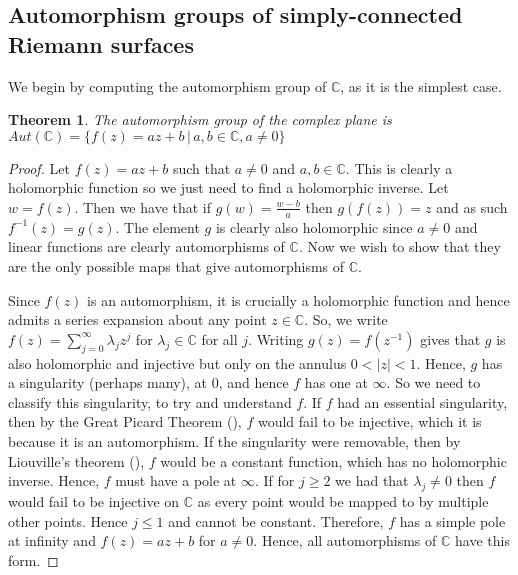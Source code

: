 \documentclass[11pt]{report}
\newtheorem{thm}{Theorem}[section]
\theoremstyle{definition}
\begin{document}
\subsection{Automorphism groups of simply-connected Riemann surfaces}
We begin by computing the automorphism group of $\mathbb{C}$, as it is the simplest case.
\begin{thm}\label{Aut(C)} 
  The automorphism group of the complex plane is ~\\$Aut(\mathbb{C})=\{f(z)=az+b \, \vert \, a, b \in  \mathbb{C}, a \neq 0\}$
\end{thm}
\begin{proof}
  Let $f(z) = az+b$ such that $a\neq 0$ and $a,b \in \mathbb{C}$. This is clearly a holomorphic function so we just need to find a holomorphic inverse. Let $w = f(z)$. Then we have that if $g(w) = \frac{w - b}{a}$ then $g(f(z))=z$ and as such $f^{-1}(z)=g(z)$. The element $g$ is clearly also holomorphic since $a \neq 0$ and linear functions are clearly automorphisms of $\mathbb{C}$. Now we wish to show that they are the only possible maps that give automorphisms of $\mathbb{C}$.

  Since $f(z)$ is an automorphism, it is crucially a holomorphic function and hence admits a series expansion about any point $z \in \mathbb{C}$. So, we write $f(z) = \sum\limits_{j=0}^{\infty}\lambda_jz^j$ for $\lambda_j \in \mathbb{C}$ for all $j$. Writing $g(z)=f(z^{-1})$ gives that $g$ is also holomorphic and injective but only on the annulus $0 < |z| < 1$. Hence, $g$ has a singularity (perhaps many), at $0$, and hence $f$ has one at $\infty$. So we need to classify this singularity, to try and understand $f$. If $f$ had an essential singularity, then by the Great Picard Theorem (\cite[p.300]{conway}), $f$ would fail to be injective, which it is because it is an automorphism. If the singularity were removable, then by Liouville's theorem (\cite[p.122]{ahlfors}), $f$ would be a constant function, which has no holomorphic inverse. Hence, $f$ must have a pole at $\infty$. If for $j\geq 2$ we had that $\lambda_j \neq 0$ then $f$ would fail to be injective on $\mathbb{C}$ as every point would be mapped to by multiple other points. Hence $j \leq 1$ and cannot be constant. Therefore, $f$ has a simple pole at infinity and $f(z) = az + b$ for $a \neq 0$. Hence, all automorphisms of $\mathbb{C}$ have this form.
\end{proof}
\end{document}
